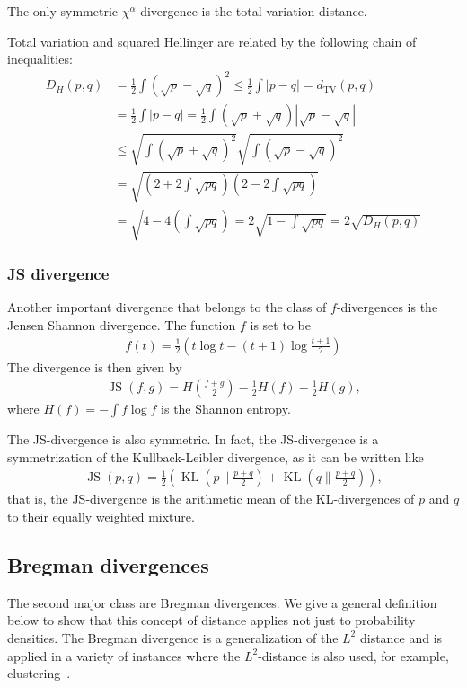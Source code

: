 The only symmetric $\chi^{\alpha}$-divergence is the total variation distance.

Total variation and squared Hellinger are related by the following chain of inequalities:
\begin{align*}
    D_H(p,q)&=\frac{1}{2}\int(\sqrt{p}-\sqrt{q})^2\le\frac{1}{2}\int|p-q|=d_{\text{TV}}(p,q)\\&
    =\frac{1}{2}\int|p-q|=\frac{1}{2}\int(\sqrt{p}+\sqrt{q})|\sqrt{p}-\sqrt{q}|\\&
    \le\sqrt{\int(\sqrt{p}+\sqrt{q})^2}\sqrt{\int(\sqrt{p}-\sqrt{q})^2}\\&
    =\sqrt{\left(2+2\int\sqrt{pq}\right)\left(2-2\int\sqrt{pq}\right)}\\&
    =\sqrt{4-4\left(\int\sqrt{pq}\right)}=2\sqrt{1-\int\sqrt{pq}}=2\sqrt{D_H(p,q)}
\end{align*}

\subsubsection*{JS divergence}

Another important divergence that belongs to the class of $f$-divergences is the Jensen Shannon divergence. The function $f$ is set to be
\begin{align*}
    f(t)=\frac{1}{2}\left(t\log{t}-(t+1)\log{\frac{t+1}{2}}\right)
\end{align*}
The divergence is then given by
\begin{align*}
    \operatorname{JS}(f,g)=H\left(\frac{f+g}{2}\right)-\frac{1}{2}H(f)-\frac{1}{2}H(g),
\end{align*}
where $H(f)=-\int f\log{f}$ is the Shannon entropy.

The JS-divergence is also symmetric. In fact, the JS-divergence is a symmetrization of the Kullback-Leibler divergence, as it can be written like
\begin{align}\label{eq:JS_KL_formula}
    \operatorname{JS}(p,q)=\frac{1}{2}\left(\operatorname{KL}(p\|\frac{p+q}{2})+\operatorname{KL}(q\|\frac{p+q}{2})\right),
\end{align}
that is, the JS-divergence is the arithmetic mean of the KL-divergences of $p$ and $q$ to their equally weighted mixture.

\subsection{Bregman divergences}

The second major class are Bregman divergences. We give a general definition below to show that this concept of distance applies not just to probability densities. The Bregman divergence is a generalization of the $L^2$ distance and is applied in a variety of instances where the $L^2$-distance is also used, for example, clustering~\cite{banerjee_clustering_2004}.

